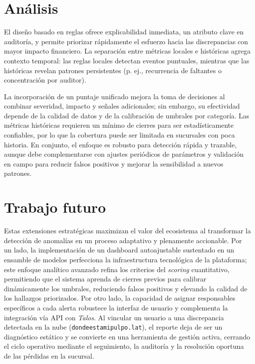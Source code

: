\documentclass[11pt]{article}
\begin{document}
\section*{Análisis}
El diseño basado en reglas ofrece explicabilidad inmediata, un atributo clave en auditoría, y permite priorizar rápidamente el esfuerzo hacia las discrepancias con mayor impacto financiero. La separación entre métricas locales e históricas agrega contexto temporal: las reglas locales detectan eventos puntuales, mientras que las históricas revelan patrones persistentes (p. ej., recurrencia de faltantes o concentración por auditor).

La incorporación de un puntaje unificado mejora la toma de decisiones al combinar severidad, impacto y señales adicionales; sin embargo, su efectividad depende de la calidad de datos y de la calibración de umbrales por categoría. Las métricas históricas requieren un mínimo de cierres para ser estadísticamente confiables, por lo que la cobertura puede ser limitada en sucursales con poca historia. En conjunto, el enfoque es robusto para detección rápida y trazable, aunque debe complementarse con ajustes periódicos de parámetros y validación en campo para reducir falsos positivos y mejorar la sensibilidad a nuevos patrones.

\section*{Trabajo futuro}
Estas extensiones estratégicas maximizan el valor del ecosistema al transformar la detección de anomalías en un proceso adaptativo y plenamente accionable. Por un lado, la implementación de un dashboard autoajustable sustentado en un ensamble de modelos perfecciona la infraestructura tecnológica de la plataforma; este enfoque analítico avanzado refina los criterios del \textit{scoring} cuantitativo, permitiendo que el sistema aprenda de cierres previos para calibrar dinámicamente los umbrales, reduciendo falsos positivos y elevando la calidad de los hallazgos priorizados. Por otro lado, la capacidad de asignar responsables específicos a cada alerta robustece la interfaz de usuario y complementa la integración vía API con \textit{Talos}. Al vincular un usuario a una discrepancia detectada en la nube (\texttt{dondeestamipulpo.lat}), el reporte deja de ser un diagnóstico estático y se convierte en una herramienta de gestión activa, cerrando el ciclo operativo mediante el seguimiento, la auditoría y la resolución oportuna de las pérdidas en la sucursal.
\end{document}
